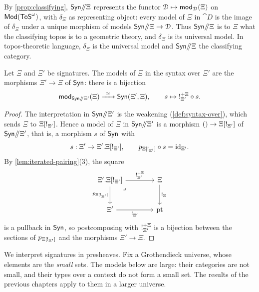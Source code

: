 \begin{remark}\label{rem:classifying}
    By \cref{prop:classifying}, $\mathsf{Syn}\mathord{/\mkern-5mu/} \Xi$ represents the functor $\mathcal{D} \mapsto \mathsf{mod}_{\mathcal{D}}(\Xi)$ on $\mathsf{Mod}(\mathsf{ToS}^\omega)$, with $\delta_\Xi$ as representing object: every model of $\Xi$ in $\cat{D}$ is the image of $\delta_\Xi$ under a unique morphism of models $\mathsf{Syn}\mathord{/\mkern-5mu/} \Xi \to \mathcal{D}$. Thus $\mathsf{Syn}\mathord{/\mkern-5mu/} \Xi$ is to $\Xi$ what the classifying topos is to a geometric theory, and $\delta_\Xi$ is its universal model. In topos-theoretic language, $\delta_\Xi$ is the universal model and $\mathsf{Syn}\mathord{/\mkern-5mu/} \Xi$ the classifying category.
\end{remark}

\begin{lemma}\label{lem:signature-morphisms}
    Let $\Xi$ and $\Xi'$ be signatures. The models of $\Xi$ in the syntax over $\Xi'$ are the morphisms $\Xi' \to \Xi$ of $\mathsf{Syn}$: there is a bijection
    \[
        \modset_{\Syn\dslash \Xi'}(\Xi) \xrightarrow{\ \simeq\ } \Syn(\Xi', \Xi), \qquad s \mapsto \bang_{\Xi'}^{+\Xi} \circ s.
    \]
\end{lemma}

\begin{proof}
    The interpretation in $\mathsf{Syn}\mathord{/\mkern-5mu/} \Xi'$ is the weakening (\cref{def:syntax-over}), which sends $\Xi$ to $\Xi[{!}_{\Xi'}]$. Hence a model of $\Xi$ in $\mathsf{Syn}\mathord{/\mkern-5mu/} \Xi'$ is a morphism $() \to \Xi[{!}_{\Xi'}]$ of $\mathsf{Syn}\mathord{/\mkern-5mu/} \Xi'$, that is, a morphism $s$ of $\mathsf{Syn}$ with
    \[
        s : \Xi' \to \Xi'.\Xi[{!}_{\Xi'}], \qquad p_{\Xi[{!}_{\Xi'}]} \circ s = \mathrm{id}_{\Xi'}.
    \]
    By \cref{lem:iterated-pairing}(3), the square
    \[\begin{tikzcd}[column sep=4em, row sep=2.5em]
        {\Xi'.\Xi[\bang_{\Xi'}]} & \Xi \\
        {\Xi'} & \pt
        \arrow["{\bang_{\Xi'}^{+\Xi}}", from=1-1, to=1-2]
        \arrow["{p_{\Xi[\bang_{\Xi'}]}}"', from=1-1, to=2-1]
        \arrow["\lrcorner"{anchor=center, pos=0.125}, draw=none, from=1-1, to=2-2]
        \arrow["{\bang_\Xi}", from=1-2, to=2-2]
        \arrow["{\bang_{\Xi'}}"', from=2-1, to=2-2]
    \end{tikzcd}\]
    is a pullback in $\mathsf{Syn}$, so postcomposing with ${!}_{\Xi'}^{+\Xi}$ is a bijection between the sections of $p_{\Xi[{!}_{\Xi'}]}$ and the morphisms $\Xi' \to \Xi$.
\end{proof}

We interpret signatures in presheaves. Fix a Grothendieck universe, whose elements are the \emph{small} sets. The models below are large: their categories are not small, and their types over a context do not form a small set. The results of the previous chapters apply to them in a larger universe.

